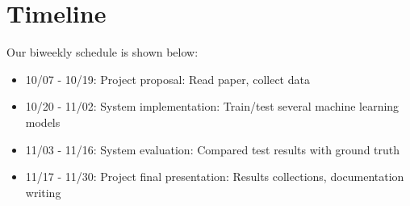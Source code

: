 \section{Timeline}
\label{sec:timeline}
Our biweekly schedule is shown below:\\
\vspace{-4mm}
\begin{itemize}
	\item 10/07 - 10/19: Project proposal: Read paper, collect data
	\item 10/20 - 11/02: System implementation: Train/test several machine learning models
	\item 11/03 - 11/16: System evaluation: Compared test results with ground truth
	\item 11/17 - 11/30: Project final presentation: Results collections, documentation writing
\end{itemize}

